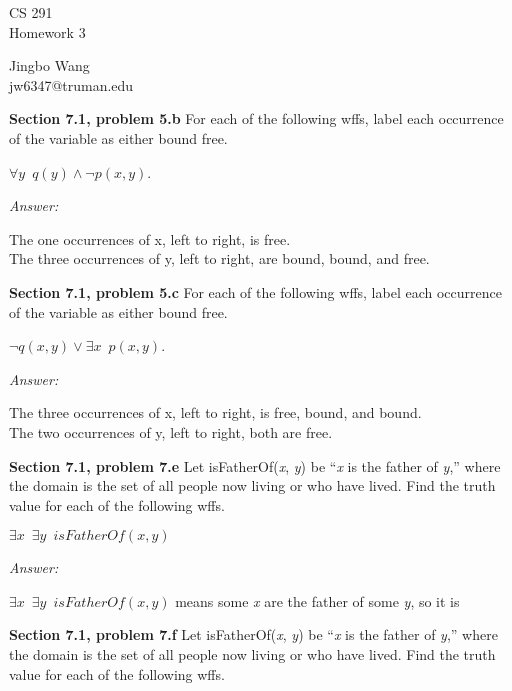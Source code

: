 \documentclass[12pt]{article}
\begin{document}
\begin{center}
{\large CS 291}\\
Homework 3
\end{center}

\begin{flushright}
Jingbo Wang \\
jw6347@truman.edu
\end{flushright}

\textbf{Section 7.1, problem 5.b}  For each of the following wffs, 
label each occurrence of the variable as either bound free.

$\forall y \enspace q(y) \land \neg p(x,y)$.

\emph{Answer:} 
\begin{center}
The one occurrences of x, left to right, is free. \\
The three occurrences of y, left to right, are bound, bound, and free.\\
\end{center}


\textbf{Section 7.1, problem 5.c}  For each of the following wffs, 
label each occurrence of the variable as either bound free.

$\neg q(x,y) \lor \exists x \enspace p(x,y)$.

\emph{Answer:} 
\begin{center}
The three occurrences of x, left to right, is free, bound, and bound. \\
The two occurrences of y, left to right, both are free. \\
\end{center}


\textbf{Section 7.1, problem 7.e}  Let isFatherOf(\emph{x}, \emph{y}) be “\emph{x} is the father of \emph{y},” 
where the domain is the set of all people now living or who have lived. 
Find the truth value for each of the following wffs.

$\exists x \enspace \exists y \enspace isFatherOf(x, y)$

\emph{Answer:} 
\begin{center}
$\exists x \enspace \exists y \enspace isFatherOf(x, y)$ means some \emph{x} are the father of some \emph{y}, so it is  \\
\end{center}


\textbf{Section 7.1, problem 7.f}  Let isFatherOf(\emph{x}, \emph{y}) be “\emph{x} is the father of 
\emph{y},” 
where the domain is the set of all people now living or who have lived. 
Find the truth value for each of the following wffs.
\end{document}
